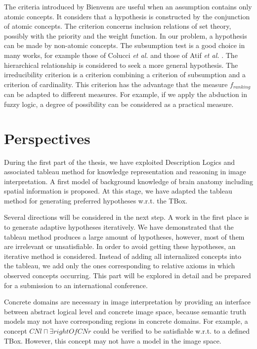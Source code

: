 \documentclass{article}
\begin{document}
The criteria introduced by Bienvenu are useful when an assumption contains only atomic concepts. It considers that a hypothesis is constructed by the conjunction of atomic concepts.
The criterion concerns inclusion relations of set theory, possibly with the priority and the weight function.
In our problem, a hypothesis can be made by non-atomic concepts. The subsumption test is a good choice in many works,
for example those of Colucci \textit{et al.} \cite{colucci2004uniform} and those of Atif \textit{et al.}  \cite{atif2014explanatory}. 
The hierarchical relationship is considered to seek a more general hypothesis.
The irreducibility criterion is a criterion combining a criterion of subsumption and a criterion of cardinality. This criterion has the advantage that the measure $f_{ranking}$  can be adapted to different measures.
For example, if we apply the abduction in fuzzy logic, a degree of possibility can be considered as a practical measure.

\section{Perspectives}\label{sec:persp}
During the first part of the thesis, we have exploited Description Logics and associated tableau method for knowledge representation and reasoning in image interpretation.
A first model of background knowledge of brain anatomy  including spatial information is proposed.  
At this stage, we have adapted the tableau method for generating preferred hypotheses w.r.t. the TBox.

Several directions will be considered in the next step.
A work in the first place is to generate adaptive hypotheses iteratively.
We have demonstrated that the tableau method produces a large amount of hypotheses, however, most of them are irrelevant or unsatisfiable.
In order to avoid getting these hypotheses, an iterative method is considered.
Instead of adding all internalized concepts into the tableau, we add only the ones corresponding to relative axioms in which observed concepts occurring.
This part will be explored in detail and be prepared for a submission to an international conference.


Concrete domains are necessary in image interpretation by providing an interface between abstract logical level and concrete image space,
because semantic truth models may not have corresponding regions in concrete domains.
For example, a concept $CNl\sqcap \exists rightOf CNr$ could be verified to be satisfiable w.r.t. to a defined TBox.
However, this concept may not have a model in the image space.
\end{document}
